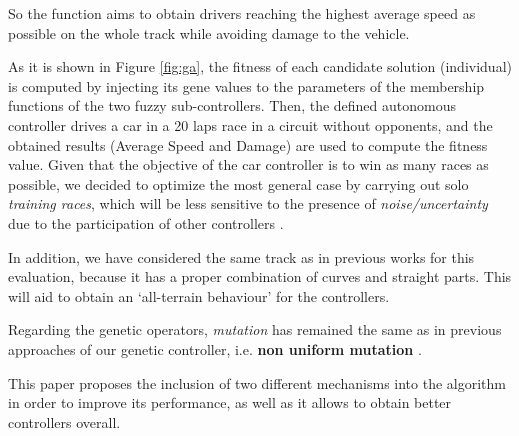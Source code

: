 \documentclass[10pt,journal,compsoc]{IEEEtran}
\begin{document}
So the function aims to obtain drivers reaching the highest average speed as possible on the whole track while avoiding damage to the vehicle.

As it is shown in Figure \ref{fig:ga}, the fitness of each candidate solution (individual) is computed by injecting its gene values to the parameters of the membership functions of the two fuzzy sub-controllers. Then, the defined autonomous controller drives a car in a 20 laps race in a circuit without opponents, and the obtained results (Average Speed and Damage) are used to compute the fitness value. 
Given that the objective of the car controller is to win as many races as
possible, we decided to optimize the most general case by carrying out solo {\em training races}, which will be less sensitive to the presence of \textit{noise/uncertainty} due to the participation of other controllers \cite{merelo2016statistical}.

In addition, we have considered the same track as in previous works
\cite{salem_cig2018} for this evaluation, because it has a proper
combination of curves and straight parts. This will aid to obtain an
`all-terrain behaviour' for the controllers.

Regarding the genetic operators, \textit{mutation} has remained the same as in previous approaches of our genetic controller, i.e. \textbf{non uniform mutation} \cite{mutation1997}. 






This paper proposes the inclusion of two different mechanisms into the algorithm in order to improve its performance, as well as it allows to obtain better controllers overall.
\end{document}
